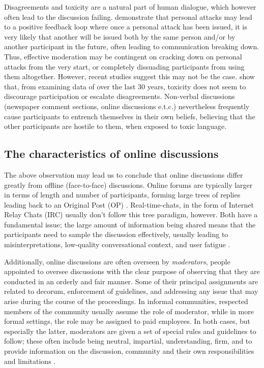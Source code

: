Disagreements and toxicity are a natural part of human dialogue, which however often lead to the discussion failing. \citet{dekock2022disagree} demonstrate that personal attacks may lead to a positive feedback loop where once a personal attack has been issued, it is very likely that another will be issued both by the same person and/or by another participant in the future, often leading to communication breaking down. Thus, effective moderation may be contingent on cracking down on personal attacks from the very start, or completely dissuading participants from using them altogether. However, recent studies suggest this may not be the case. \citet{Avalle2024PersistentIP} show that, from examining data of over the last 30 years, toxicity does not seem to discourage participation or escalate disagreements. Non-verbal discussions (newspaper comment sections, online discussions e.t.c.) nevertheless frequently cause participants to entrench themselves in their own beliefs, believing that the other participants are hostile to them, when exposed to toxic language.

\subsection{The characteristics of online discussions}
\label{sec:background:arguments-online}

The above observation may lead us to conclude that online discussions differ greatly from offline (face-to-face) discussions. Online forums are typically larger in terms of length and number of participants, forming large trees of replies leading back to an Original Post (OP) \cite{boschi2021wordunderstandingsampleonline}. Real-time-chats, in the form of Internet Relay Chats (IRC) usually don't follow this tree paradigm, however. Both have a fundamental issue; the large amount of information being shared means that the participants need to sample the discussion effectively, usually leading to misinterpretations, low-quality conversational context, and user fatigue \cite{boschi2021wordunderstandingsampleonline}. 

Additionally, online discussions are often overseen by \textit{moderators}, people appointed to oversee discussions with the clear purpose of observing that they are conducted in an orderly and fair manner. Some of their principal assignments are related to decorum, enforcement of guidelines, and addressing any issue that may arise during the course of the proceedings. In informal communities, respected members of the community usually assume the role of moderator, while in more formal settings, the role may be assigned to paid employees. In both cases, but especially the latter, moderators are given a set of special rules and guidelines to follow; these often include being neutral, impartial, understanding, firm, and to provide information on the discussion, community and their own responsibilities and limitations \cite{Cornell_eRulemaking2017}.

